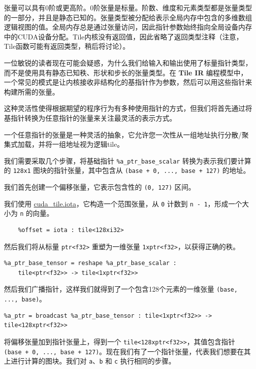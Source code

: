 \documentclass{article}
\begin{document}
张量可以具有0阶或更高阶。0阶张量是标量。阶数、维度和元素类型都是张量类型的一部分，并且是静态已知的。张量类型被分配给表示全局内存中包含的多维数组逻辑视图的值。全局内存总是通过张量访问，因此指针参数始终指向全局设备内存中的CUDA设备分配。Tile内核没有返回值，因此省略了返回类型注释（注意，Tile函数可能有返回类型，稍后将讨论）。


一位敏锐的读者现在可能会疑惑，为什么我们给输入和输出使用了标量指针类型，而不是使用具有静态已知秩、形状和步长的张量类型。在 \textbf{Tile IR} 编程模型中，一个常见的模式是让内核接收非结构化的基指针作为参数，然后可以用这些指针来构建所需的张量。

这种灵活性使得根据期望的程序行为有多种使用指针的方式，但我们将首先通过将基指针转换为任意指针的张量来关注最灵活的表示方式。

一个任意指针的张量是一种灵活的抽象，它允许您一次性从一组地址执行分散/聚集式加载，并将一组地址视为逻辑tile。


我们需要采取几个步骤，将基础指针 \texttt{\%a\_ptr\_base\_scalar} 转换为表示我们要计算的 \texttt{128x1} 图块的指针张量，其中包含从 \texttt{(base + 0, ..., base + 127)} 的地址。


我们首先创建一个偏移张量，它表示包含性的 \texttt{(0, 127)} 区间。

我们使用 \href{https://docs.nvidia.com/cuda/tile-ir/latest/sections/operations.html#op-cuda-tile-iota}{cuda\_tile.iota}，它构造一个范围张量，从 \texttt{0} 计数到 \texttt{n - 1}，形成一个大小为 \texttt{n} 的向量。


\begin{lstlisting}
    %offset = iota : tile<128xi32>
\end{lstlisting}

然后我们将从标量 \texttt{ptr<f32>} 重塑为一维张量 \texttt{1xptr<f32>}，以获得正确的秩。


\begin{lstlisting}
%a_ptr_base_tensor = reshape %a_ptr_base_scalar :
    tile<ptr<f32>> -> tile<1xptr<f32>>
\end{lstlisting}

然后我们广播指针，这样我们就得到了一个包含128个元素的一维张量 \texttt{(base, ..., base)}。


\begin{lstlisting}
%a_ptr = broadcast %a_ptr_base_tensor : tile<1xptr<f32>> -> tile<128xptr<f32>>
\end{lstlisting}

将偏移张量加到指针张量上，得到一个 \texttt{tile<128xptr<f32>>}，其值包含指针 \texttt{(base + 0, ..., base + 127)}。现在我们有了一个指针张量，代表我们想要在其上进行计算的图块。我们对 \texttt{a}、\texttt{b} 和 \texttt{c} 执行相同的步骤。
\end{document}
